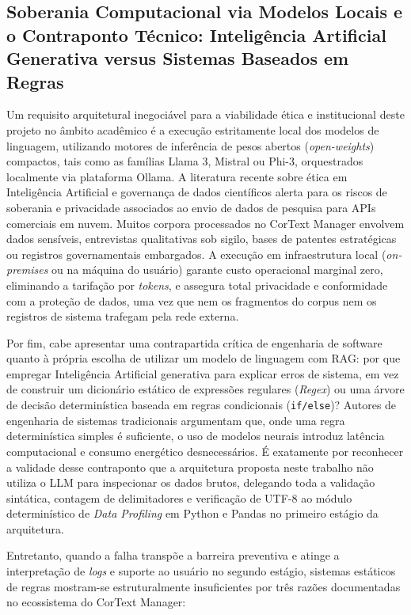 \documentclass[
	oneside,
	a4paper,
	12pt,
	chapter=TITLE,
	section=TITLE,
	english,
	brazilian
]{abntex2}
\begin{document}
\FloatBarrier
\subsection{Soberania Computacional via Modelos Locais e o Contraponto Técnico: Inteligência Artificial Generativa versus Sistemas Baseados em Regras}\label{sec:soberania_computacional_via_modelos_loca}


Um requisito arquitetural inegociável para a viabilidade ética e institucional deste projeto no âmbito acadêmico é a execução estritamente local dos modelos de linguagem, utilizando motores de inferência de pesos abertos (\textit{open-weights}) compactos, tais como as famílias Llama 3, Mistral ou Phi-3, orquestrados localmente via plataforma Ollama. A literatura recente sobre ética em Inteligência Artificial e governança de dados científicos alerta para os riscos de soberania e privacidade associados ao envio de dados de pesquisa para APIs comerciais em nuvem. Muitos corpora processados no CorText Manager envolvem dados sensíveis, entrevistas qualitativas sob sigilo, bases de patentes estratégicas ou registros governamentais embargados. A execução em infraestrutura local (\textit{on-premises} ou na máquina do usuário) garante custo operacional marginal zero, eliminando a tarifação por \textit{tokens}, e assegura total privacidade e conformidade com a proteção de dados, uma vez que nem os fragmentos do corpus nem os registros de sistema trafegam pela rede externa.

Por fim, cabe apresentar uma contrapartida crítica de engenharia de software quanto à própria escolha de utilizar um modelo de linguagem com RAG: por que empregar Inteligência Artificial generativa para explicar erros de sistema, em vez de construir um dicionário estático de expressões regulares (\textit{Regex}) ou uma árvore de decisão determinística baseada em regras condicionais (\texttt{if/\allowbreak else})? Autores de engenharia de sistemas tradicionais argumentam que, onde uma regra determinística simples é suficiente, o uso de modelos neurais introduz latência computacional e consumo energético desnecessários. É exatamente por reconhecer a validade desse contraponto que a arquitetura proposta neste trabalho não utiliza o LLM para inspecionar os dados brutos, delegando toda a validação sintática, contagem de delimitadores e verificação de UTF-8 ao módulo determinístico de \textit{Data Profiling} em Python e Pandas no primeiro estágio da arquitetura.

Entretanto, quando a falha transpõe a barreira preventiva e atinge a interpretação de \textit{logs} e suporte ao usuário no segundo estágio, sistemas estáticos de regras mostram-se estruturalmente insuficientes por três razões documentadas no ecossistema do CorText Manager:
\end{document}
